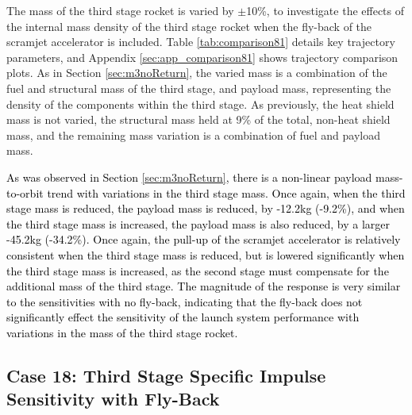 The mass of the third stage rocket is varied by $\pm$10\%, to investigate the effects of the internal mass density of the third stage rocket when the fly-back of the scramjet accelerator is included. Table \ref{tab:comparison81} details key trajectory parameters, and Appendix \ref{sec:app_comparison81} shows trajectory comparison plots. As in Section \ref{sec:m3noReturn}, the varied mass is a combination of the fuel and structural mass of the third stage, and payload mass, representing the density of the components within the third stage. As previously, the heat shield mass is not varied, the structural mass held at 9\% of the total, non-heat shield mass, and the remaining mass variation is a combination of fuel and payload mass.

\textcolor{black}{
As was observed in Section \ref{sec:m3noReturn}, there is a non-linear payload mass-to-orbit trend with variations in the third stage mass. Once again, when the third stage mass is reduced, the payload mass is reduced, by -12.2kg (-9.2\%), and when the third stage mass is increased, the payload mass is also reduced, by a larger -45.2kg (-34.2\%). Once again, the pull-up of the scramjet accelerator is relatively consistent when the third stage mass is reduced, but is lowered significantly when the third stage mass is increased, as the second stage must compensate for the additional mass of the third stage. The magnitude of the response is very similar to the sensitivities with no fly-back, indicating that the fly-back does not significantly effect the sensitivity of the launch system performance with variations in the mass of the third stage rocket. 
}


\subsection{Case 18: Third Stage Specific Impulse Sensitivity with Fly-Back}


